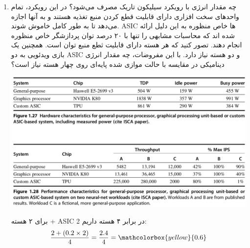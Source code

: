 \begin{enumerate}
	\item چه مقدار انرژی با رویکرد سیلیکون تاریک مصرف می‌شود؟ در این رویکرد، تمام واحد‌های سخت افزاری دارای قابلیت قطع کردن منبع تغذیه هستند و به آنها اجازه می‌دهد تا به طور کامل خاموش شوند. ASIC ها خاص منظوره به این دلیل ارائه شده اند که محاسبات مشابهی را تنها با ۲۰ درصد توان پردازشگر خاص منظوره انجام دهند. تصور کنید که هر هسته دارای قابلیت ثطع منبع توان است. همچنین یک بازی ویدئویی به دو ASIC و دو هسته نیاز دارد. با این مفروضات، چه مقدار انرژی دینامیکی در مقایسه با حالت موازی شده پایه‌ای روی چهار هسته نیاز است؟
	\begin{center}
		\includegraphics[scale=0.4]{pics/img1.png}
	\end{center}
	

	\begin{qsolve}
برای ۲ هسته + ASIC 2 در برابر ۴ هسته داریم:
	\begin{equation}
		\frac{2 + (0.2 \times 2)}{4} = \frac{2.4}{4} = \mathcolorbox{yellow}{0.6}
	\end{equation}
	\end{qsolve}







\end{enumerate}